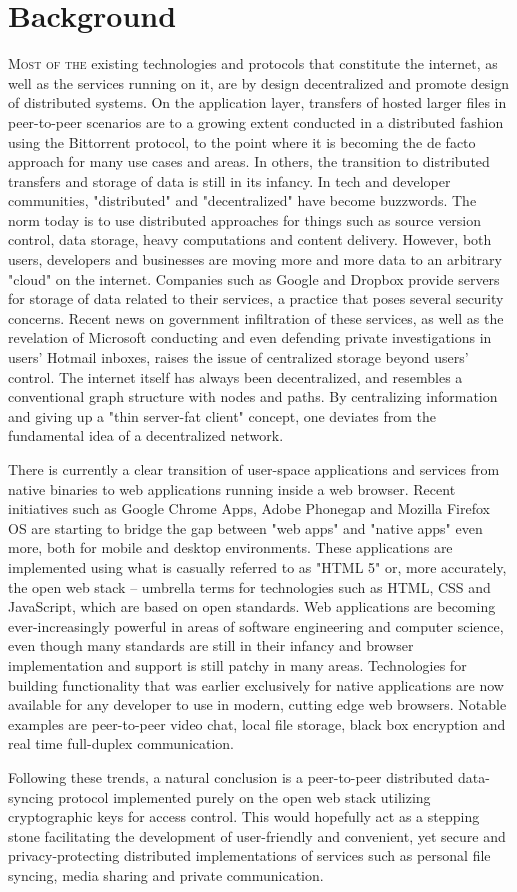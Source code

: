 \section{Background}
\lettrine[lines=3]{M}{ost of the} existing technologies and protocols that constitute the internet, as well as the services running on it, are by design decentralized and promote design of distributed systems. On the application layer, transfers of hosted larger files in peer-to-peer scenarios are to a growing extent conducted in a distributed fashion using the Bittorrent protocol, to the point where it is becoming the de facto approach for many use cases and areas. In others, the transition to distributed transfers and storage of data is still in its infancy. In tech and developer communities, "distributed" and "decentralized" have become buzzwords. The norm today is to use distributed approaches for things such as source version control, data storage, heavy computations and content delivery.
However, both users, developers and businesses are moving more and more data to an arbitrary "cloud" on the internet. Companies such as Google and Dropbox provide servers for storage of data related to their services, a practice that poses several security concerns. Recent news on government infiltration of these services, as well as the revelation of Microsoft conducting and even defending private investigations in users' Hotmail inboxes, raises the issue of centralized storage beyond users' control. The internet itself has always been decentralized, and resembles a conventional graph structure with nodes and paths. By centralizing information and giving up a "thin server-fat client" concept, one deviates from the fundamental idea of a decentralized network.

There is currently a clear transition of user-space applications and services from native binaries to web applications running inside a web browser. Recent initiatives such as Google Chrome Apps, Adobe Phonegap and Mozilla Firefox OS are starting to bridge the gap between "web apps" and "native apps" even more, both for mobile and desktop environments. These applications are implemented using what is casually referred to as "HTML 5" or, more accurately, the open web stack – umbrella terms for technologies such as HTML, CSS and JavaScript, which are based on open standards. Web applications are becoming ever-increasingly powerful in areas of software engineering and computer science, even though many standards are still in their infancy and browser implementation and support is still patchy in many areas. Technologies for building functionality that was earlier exclusively for native applications are now available for any developer to use in modern, cutting edge web browsers. Notable examples are peer-to-peer video chat, local file storage, black box encryption and real time full-duplex communication.

Following these trends, a natural conclusion is a peer-to-peer distributed data-syncing protocol implemented purely on the open web stack utilizing cryptographic keys for access control. This would hopefully act as a stepping stone facilitating the development of user-friendly and convenient, yet secure and privacy-protecting distributed implementations of services such as personal file syncing, media sharing and private communication.

